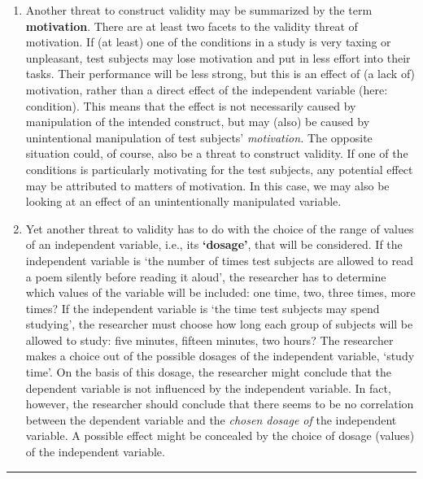\documentclass[
]{book}
\begin{document}
\begin{enumerate}
\def\labelenumi{\arabic{enumi}.}
\setcounter{enumi}{2}
\item
  Another threat to construct validity may be summarized by the term \textbf{motivation}. There are at least two facets to the validity threat of motivation. If (at least) one of the conditions in a study is very taxing or unpleasant, test subjects may lose motivation and put in less effort into their tasks. Their performance will be less strong, but this is an effect of (a lack of) motivation, rather than a direct effect of the independent variable (here: condition). This means that the effect is not necessarily caused by manipulation of the intended construct, but may (also) be caused by unintentional manipulation of test subjects' \emph{motivation.} The opposite situation could, of course, also be a threat to construct validity. If one of the conditions is particularly motivating for the test subjects, any potential effect may be attributed to matters of motivation. In this case, we may also be looking at an effect of an unintentionally manipulated variable.
\item
  Yet another threat to validity has to do with the choice of the range of values of an independent variable, i.e., its \textbf{`dosage'}, that will be considered. If the independent variable is `the number of times test subjects are allowed to read a poem silently before reading it aloud', the researcher has to determine which values of the variable will be included: one time, two, three times, more times? If the independent variable is `the time test subjects may spend studying', the researcher must choose how long each group of subjects will be allowed to study: five minutes, fifteen minutes, two hours? The researcher makes a choice out of the possible dosages of the independent variable, `study time'. On the basis of this dosage, the researcher might conclude that the dependent variable is not influenced by the independent variable. In fact, however, the researcher should conclude that there seems to be no correlation between the dependent variable and the \emph{chosen dosage of} the independent variable. A possible effect might be concealed by the choice of dosage (values) of the independent variable.
\end{enumerate}

\begin{center}\rule{0.5\linewidth}{0.5pt}\end{center}
\end{document}
